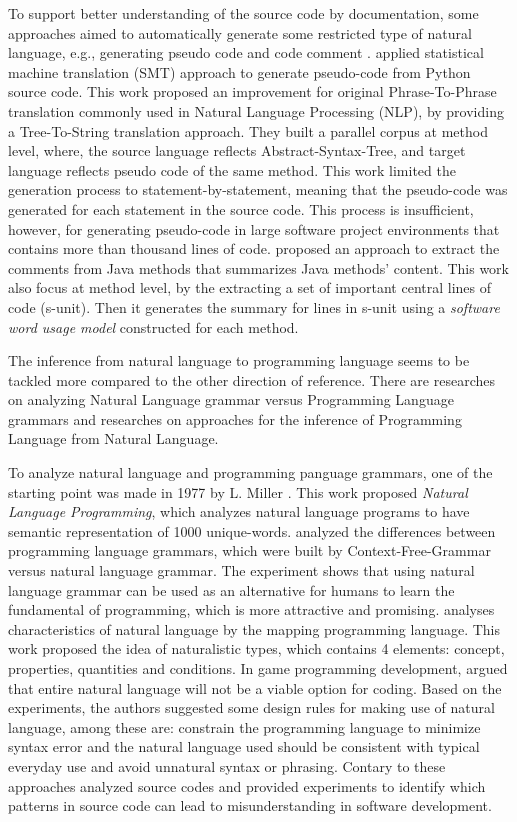 \documentclass[11pt]{article}
\begin{document}
To support better understanding of the source code by documentation, some approaches aimed to automatically generate some restricted type of natural language, e.g., generating pseudo code \cite{Oda:2015} and code comment \cite{Sridhara:2010}. \cite{Oda:2015} applied statistical machine translation (SMT) approach to generate pseudo-code from Python source code. This work proposed an improvement for original Phrase-To-Phrase translation commonly used in Natural Language Processing (NLP), by providing a Tree-To-String translation approach. They built a parallel corpus at method level, where, the source language reflects Abstract-Syntax-Tree, and target language reflects pseudo code of the same method. This work limited the generation process to statement-by-statement, meaning that the pseudo-code was generated for each statement in the source code. This process is insufficient, however, for generating pseudo-code in large software project environments that contains more than thousand lines of code. \cite{Sridhara:2010} proposed an approach to extract the comments from Java methods that summarizes Java methods’ content. This work also focus at method level, by the extracting a set of important central lines of code (s-unit). Then it generates the summary for lines in s-unit using a \emph{software word usage model} constructed for each method.

The inference from natural language to programming language seems to be tackled more compared to the other direction of reference. There are researches on analyzing Natural Language grammar versus Programming Language grammars and researches on approaches for the inference of Programming Language from Natural Language.

To analyze natural language and programming panguage grammars, one of the starting point was made in 1977 by L. Miller \cite{Miller:1977}. This work proposed \emph{Natural Language Programming}, which analyzes natural language programs to have semantic representation of 1000 unique-words. \cite{Osvaldo:2013} analyzed the differences between programming language grammars, which were built by Context-Free-Grammar versus natural language grammar. The experiment shows that using natural language grammar can be used as an alternative for humans to learn the fundamental of programming, which is more attractive and promising. \cite{Knoll:2011} analyses characteristics of natural language by the mapping programming language.  This work proposed the idea of naturalistic types, which contains 4 elements: concept, properties, quantities and conditions. In game programming development, \cite{Judith:2015} argued that entire natural language will not be a viable option for coding. Based on the experiments, the authors suggested some design rules for making use of natural language, among these are: constrain the programming language to minimize syntax error and the natural language used should be consistent with typical everyday use and avoid unnatural syntax or phrasing. Contary to these approaches \cite{Gopstein:2017} analyzed source codes and provided experiments to identify which patterns in source code can lead to misunderstanding in software development.
 
\end{document}
